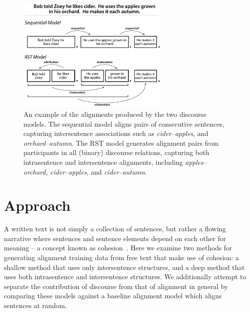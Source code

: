 \begin{figure}[t!]
\begin{center}
\includegraphics[width=75mm]{mainmatter/naacl2015-alignment/rst2a.pdf}
\caption{{\small An example of the alignments produced by the two discourse models.  The sequential model aligns pairs of consecutive sentences, capturing intersentence associations such as \emph{cider--apples}, and \emph{orchard--autumn}.  The RST model generates alignment pairs from participants in all (binary) discourse relations, capturing both intrasentence and intersentence alignments, including 
\emph{apples--orchard, cider--apples}, and \emph{cider--autumn}.}}
\label{fig:examples}
\end{center}
\end{figure}

\section{Approach}
\label{sec-naacl2015:approach}

A written text is not simply a collection of sentences, but rather a flowing narrative where sentences and sentence elements depend on each other for meaning -- a concept known as cohesion~\cite{halliday2014cohesion}.  
Here we examine two methods for generating alignment training data from free text that make use of cohesion: a shallow method that uses only intersentence structures, and a deep method that uses both intrasentence and intersentence structures.
We additionally attempt to separate the contribution of discourse from that of alignment in general by comparing these models against a baseline alignment model which aligns sentences at random.

